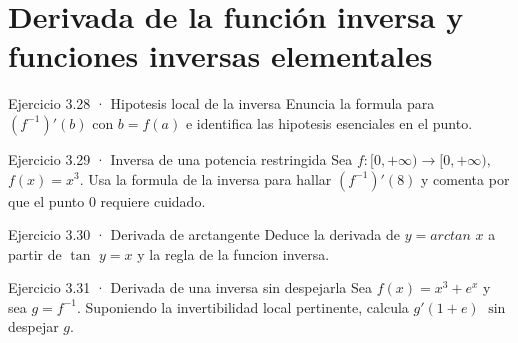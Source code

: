 \documentclass[10pt,a4paper,oneside,openany]{book}
\begin{document}
\section{Derivada de la función inversa y funciones inversas elementales}
\begin{PSevenExerciseFixed}{Ejercicio 3.28 · Hipotesis local de la inversa}
Enuncia la formula para \((f^{-1})'(b)\) con \(b=f(a)\) e identifica las hipotesis esenciales en el punto.
\end{PSevenExerciseFixed}
\begin{PSevenExerciseFixed}{Ejercicio 3.29 · Inversa de una potencia restringida}
Sea \(f:[0,+\infty )\to [0,+\infty ),\) \(f(x)=x^{3}\). Usa la formula de la inversa para hallar \((f^{-1})'(8)\) y comenta por que el punto \(0\) requiere cuidado.
\end{PSevenExerciseFixed}
\begin{PSevenExerciseFixed}{Ejercicio 3.30 · Derivada de arctangente}
Deduce la derivada de \(y=arctan\) \(x\) a partir de \(\tan\) \(y=x\) y la regla de la funcion inversa.
\end{PSevenExerciseFixed}
\begin{PSevenExerciseFixed}{Ejercicio 3.31 · Derivada de una inversa sin despejarla}
Sea \(f(x)=x^{3}+e^x\) y sea \(g=f^{-1}\). Suponiendo la invertibilidad local pertinente, calcula \(g'(1+e)\) \(\sin\) despejar \(g\).
\end{PSevenExerciseFixed}
\end{document}

